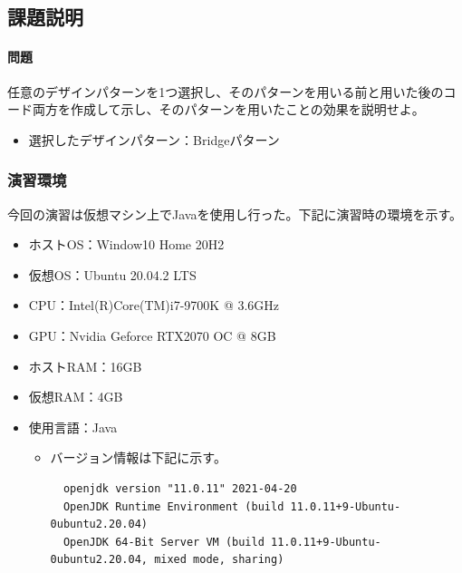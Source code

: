 \documentclass[dvipdfmx]{jsarticle}
\begin{document}
\subsection{課題説明}
\paragraph{問題} 任意のデザインパターンを1つ選択し、そのパターンを用いる前と用いた後のコード両方を作成して示し、そのパターンを用いたことの効果を説明せよ。
\begin{itemize}
  \item 選択したデザインパターン：Bridgeパターン
\end{itemize}

\subsubsection{演習環境}
今回の演習は仮想マシン上でJavaを使用し行った。下記に演習時の環境を示す。
\begin{itemize}
  \item ホストOS：Window10 Home 20H2
  \item 仮想OS：Ubuntu 20.04.2 LTS
  \item CPU：Intel(R)Core(TM)i7-9700K @ 3.6GHz
  \item GPU：Nvidia Geforce RTX2070 OC @ 8GB
  \item ホストRAM：16GB
  \item 仮想RAM：4GB
  \item 使用言語：Java
  \begin{itemize}
    \item バージョン情報は下記に示す。
    \begin{verbatim}
  openjdk version "11.0.11" 2021-04-20
  OpenJDK Runtime Environment (build 11.0.11+9-Ubuntu-0ubuntu2.20.04)
  OpenJDK 64-Bit Server VM (build 11.0.11+9-Ubuntu-0ubuntu2.20.04, mixed mode, sharing)
    \end{verbatim}
  \end{itemize}
\end{itemize}
\end{document}
